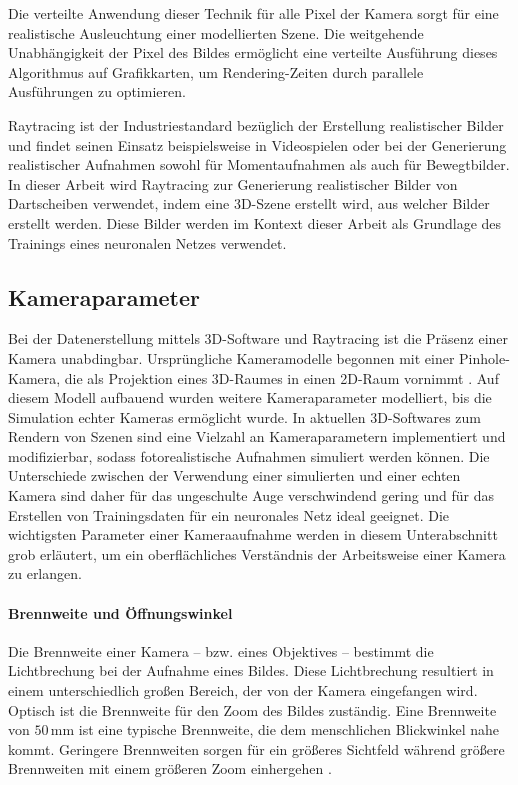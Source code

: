 Die verteilte Anwendung dieser Technik für alle Pixel der Kamera sorgt für eine realistische Ausleuchtung einer modellierten Szene. Die weitgehende Unabhängigkeit der Pixel des Bildes ermöglicht eine verteilte Ausführung dieses Algorithmus auf Grafikkarten, um Rendering-Zeiten durch parallele Ausführungen zu optimieren.

Raytracing ist der Industriestandard bezüglich der Erstellung realistischer Bilder und findet seinen Einsatz beispielsweise in Videospielen oder bei der Generierung realistischer Aufnahmen sowohl für Momentaufnahmen als auch für Bewegtbilder. In dieser Arbeit wird Raytracing zur Generierung realistischer Bilder von Dartscheiben verwendet, indem eine 3D-Szene erstellt wird, aus welcher Bilder erstellt werden. Diese Bilder werden im Kontext dieser Arbeit als Grundlage des Trainings eines neuronalen Netzes verwendet.


\subsection{Kameraparameter}
\label{sec:kameras}

Bei der Datenerstellung mittels 3D-Software und Raytracing ist die Präsenz einer Kamera unabdingbar. Ursprüngliche Kameramodelle begonnen mit einer Pinhole-Kamera, die als Projektion eines 3D-Raumes in einen 2D-Raum vornimmt \cite{pinhole_camera}. Auf diesem Modell aufbauend wurden weitere Kameraparameter modelliert, bis die Simulation echter Kameras ermöglicht wurde. In aktuellen 3D-Softwares zum Rendern von Szenen sind eine Vielzahl an Kameraparametern implementiert und modifizierbar, sodass fotorealistische Aufnahmen simuliert werden können. Die Unterschiede zwischen der Verwendung einer simulierten und einer echten Kamera sind daher für das ungeschulte Auge verschwindend gering und für das Erstellen von Trainingsdaten für ein neuronales Netz ideal geeignet. Die wichtigsten Parameter einer Kameraaufnahme werden in diesem Unterabschnitt grob erläutert, um ein oberflächliches Verständnis der Arbeitsweise einer Kamera zu erlangen.

\paragraph{Brennweite und Öffnungswinkel}

Die Brennweite einer Kamera -- bzw. eines Objektives -- bestimmt die Lichtbrechung bei der Aufnahme eines Bildes. Diese Lichtbrechung resultiert in einem unterschiedlich großen Bereich, der von der Kamera eingefangen wird. Optisch ist die Brennweite für den Zoom des Bildes zuständig. Eine Brennweite von $50\,\text{mm}$ ist eine typische Brennweite, die dem menschlichen Blickwinkel nahe kommt. Geringere Brennweiten sorgen für ein größeres Sichtfeld während größere Brennweiten mit einem größeren Zoom einhergehen \cite{focal_lentgh}.

